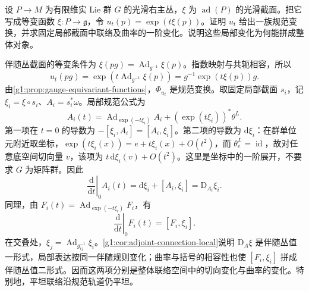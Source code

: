\begin{exercise}\label{g1:ex:infinitesimal-principal-gauge}
	设 \(P\to M\) 为有限维实 Lie 群 \(G\) 的光滑右主丛，\(\xi\) 为 \(\operatorname{ad}(P)\) 的光滑截面。把它写成等变函数 \(\xi:P\to\mathfrak g\)，令 \(u_t(p)=\exp(t\xi(p))\)。证明 \(u_t\) 给出一族规范变换，并求固定局部截面中联络及曲率的一阶变化。说明这些局部变化为何能拼成整体对象。
\end{exercise}
\begin{solution}
	伴随丛截面的等变条件为 \(\xi(pg)=\operatorname{Ad}_{g^{-1}}\xi(p)\)。指数映射与共轭相容，所以
	\[
		u_t(pg)=\exp(t\operatorname{Ad}_{g^{-1}}\xi(p))
		=g^{-1}\exp(t\xi(p))g.
	\]
	由\cref{g1:prop:gauge-equivariant-functions}，\(\Phi_{u_t}\) 是规范变换。取固定局部截面 \(s_i\)，记 \(\xi_i=\xi\circ s_i\)、\(A_i=s_i^*\omega\)。局部规范公式为
	\[
		A_i(t)=\operatorname{Ad}_{\exp(-t\xi_i)}A_i
		+(\exp(t\xi_i))^*\theta^L.
	\]
	第一项在 \(t=0\) 的导数为 \(-[\xi_i,A_i]=[A_i,\xi_i]\)。第二项的导数为 \(\mathrm{d}\xi_i\)：在群单位元附近取坐标，\(\exp(t\xi_i(x))=e+t\xi_i(x)+O(t^2)\)，而 \(\theta^L_e=\operatorname{id}\)，故对任意底空间切向量 \(v\)，该项为 \(t\,\mathrm{d}\xi_i(v)+O(t^2)\)。这里是坐标中的一阶展开，不要求 \(G\) 为矩阵群。因此
	\[
		\left.\frac{\mathrm{d}}{\mathrm{d}t}\right|_{0}A_i(t)
		=\mathrm{d}\xi_i+[A_i,\xi_i]=\mathrm{D}_{A_i}\xi_i.
	\]
	同理，由 \(F_i(t)=\operatorname{Ad}_{\exp(-t\xi_i)}F_i\)，有
	\[
		\left.\frac{\mathrm{d}}{\mathrm{d}t}\right|_{0}F_i(t)=[F_i,\xi_i].
	\]
	在交叠处，\(\xi_j=\operatorname{Ad}_{g_{ij}^{-1}}\xi_i\)。\cref{g1:cor:adjoint-connection-local}说明 \(\mathrm{D}_A\xi\) 是伴随丛值一形式，局部表达按同一伴随规则变化；曲率与括号的相容性也使 \([F_i,\xi_i]\) 拼成伴随丛值二形式。因而这两项分别是整体联络空间中的切向变化与曲率的变化。特别地，平坦联络沿规范轨道仍平坦。
\end{solution}

